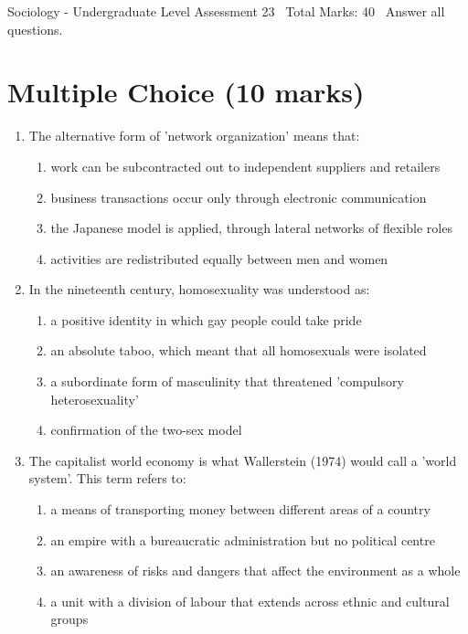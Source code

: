 \documentclass[12pt]{article}
\begin{document}
\begin{center}
Sociology - Undergraduate Level Assessment 23 \
Total Marks: 40 \
Answer all questions.
\end{center}

\section*{Multiple Choice (10 marks)}
\begin{enumerate}[label=\arabic*.]
\item The alternative form of 'network organization' means that:
\begin{enumerate}[label=(\alph*)]
    \item work can be subcontracted out to independent suppliers and retailers
    \item business transactions occur only through electronic communication
    \item the Japanese model is applied, through lateral networks of flexible roles
    \item activities are redistributed equally between men and women
\end{enumerate}
\item In the nineteenth century, homosexuality was understood as:
\begin{enumerate}[label=(\alph*)]
    \item a positive identity in which gay people could take pride
    \item an absolute taboo, which meant that all homosexuals were isolated
    \item a subordinate form of masculinity that threatened 'compulsory heterosexuality'
    \item confirmation of the two-sex model
\end{enumerate}
\item The capitalist world economy is what Wallerstein (1974) would call a 'world system'. This term refers to:
\begin{enumerate}[label=(\alph*)]
    \item a means of transporting money between different areas of a country
    \item an empire with a bureaucratic administration but no political centre
    \item an awareness of risks and dangers that affect the environment as a whole
    \item a unit with a division of labour that extends across ethnic and cultural groups

\end{enumerate}
\end{enumerate}
\end{document}
